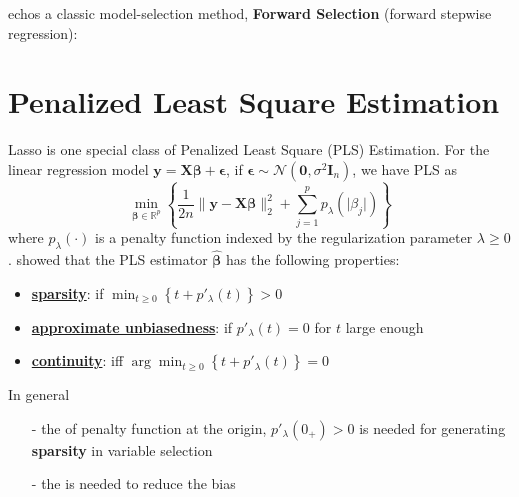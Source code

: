 \documentclass[twoside]{article}
\begin{document}
echos a classic model-selection method, \textbf{Forward Selection} (forward stepwise regression):

\section{Penalized Least Square Estimation}
Lasso is one special class of Penalized Least Square (PLS) Estimation. For the linear regression model $\mathbf{y}=\mathbf{X}\boldsymbol{\beta}+\boldsymbol{\epsilon}$, if $\boldsymbol{\epsilon} \sim \mathcal{N}(\mathbf{0},\sigma^2 \mathbf{I}_n)$, we have PLS as
$$
\min_{\boldsymbol{\beta}\in \mathbb{R}^p}\left\{ \frac{1}{2n} \lVert \mathbf{y}-\mathbf{X}\boldsymbol{\beta} \rVert^2_2 + \sum^p_{j=1}p_{\lambda}\left( \lvert \beta_j \rvert \right) \right\}
$$
where $p_{\lambda}(\cdot)$ is a penalty function indexed by the regularization parameter $\lambda \geq 0$. \citet{antoniadis2001regularization} showed that the PLS estimator $\hat{\boldsymbol{\beta}}$ has the following properties:
\begin{itemize}
    \item \textbf{\underline{sparsity}}: if $\min_{t\geq 0}\left\{ t+p'_{\lambda}(t) \right\}>0$
    \item \textbf{\underline{approximate unbiasedness}}: if $p'_{\lambda}(t)=0$ for $t$ large enough
    \item \textbf{\underline{continuity}}: iff $\arg \min_{t\geq 0}\left\{ t+p'_{\lambda}(t) \right\}=0$
\end{itemize}
In general
\begin{itemize}
    \item[-] the  of penalty function at the origin, $p'_{\lambda}(0_+)>0$ is needed for generating \textbf{sparsity} in variable selection
    \item[-] the  is needed to reduce the bias
\end{itemize}
\end{document}

